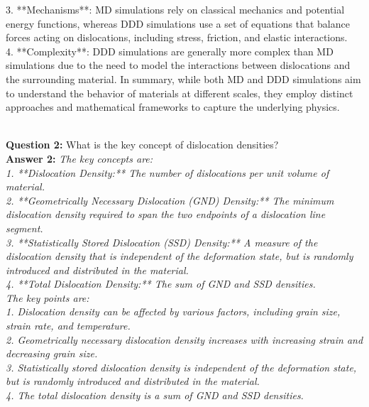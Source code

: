 {3. **Mechanisms**: MD simulations rely on classical mechanics and potential energy functions, whereas DDD simulations use a set of equations that balance forces acting on dislocations, including stress, friction, and elastic interactions.\\
4. **Complexity**: DDD simulations are generally more complex than MD simulations due to the need to model the interactions between dislocations and the surrounding material.  In summary, while both MD and DDD simulations aim to understand the behavior of materials at different scales, they employ distinct approaches and mathematical frameworks to capture the underlying physics.}

\noindent\\
\textbf{Question 2:}
What is the key concept of dislocation densities?\\
\textbf{Answer 2:}
\textit{\small The key concepts are:\\
1. **Dislocation Density:**  The number of dislocations per unit volume of material.\\
2. **Geometrically Necessary Dislocation (GND) Density:** The minimum dislocation density required to span the two endpoints of a dislocation line segment.\\
3. **Statistically Stored Dislocation (SSD) Density:** A measure of the dislocation density that is independent of the deformation state, but is randomly introduced and distributed in the material.\\
4. **Total Dislocation Density:** The sum of GND and SSD densities.\\
The key points are: \\
1. Dislocation density can be affected by various factors, including grain size, strain rate, and temperature.\\
2. Geometrically necessary dislocation density increases with increasing strain and decreasing grain size.\\
3. Statistically stored dislocation density is independent of the deformation state, but is randomly introduced and distributed in the material.\\
4. The total dislocation density is a sum of GND and SSD densities. 
}